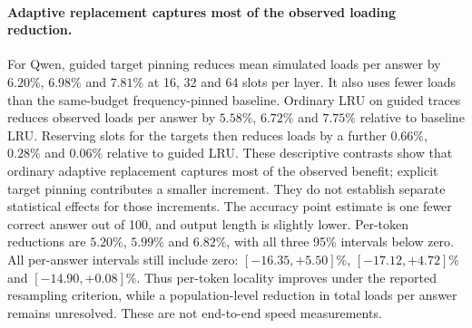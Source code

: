 \documentclass[12pt,a4paper,twoside,openright]{book}
\begin{document}
\begin{table}[ht]
\centering\small
\caption{Relative change (percent) for guided target pinning versus baseline LRU, with paired dataset-stratified problem-bootstrap 95\% intervals. Negative values mean fewer simulated loads. Intervals use 5,000 resamples, seed 42, and no multiplicity correction.}
\label{tab:cache-multimodel-effects}
\end{table}


\paragraph{Adaptive replacement captures most of the observed loading reduction.}
For Qwen, guided target pinning reduces mean simulated loads per answer by
$6.20\%$, $6.98\%$ and $7.81\%$ at 16, 32 and 64 slots per layer. It also uses
fewer loads than the same-budget frequency-pinned baseline. Ordinary LRU on
guided traces reduces observed loads per answer by $5.58\%$, $6.72\%$ and
$7.75\%$ relative to baseline LRU. Reserving slots for the targets then
reduces loads by a further $0.66\%$, $0.28\%$ and $0.06\%$ relative to guided
LRU. These descriptive contrasts show that ordinary adaptive replacement
captures most of the observed benefit; explicit target pinning contributes a
smaller increment. They do not establish separate statistical effects for
those increments. The accuracy point estimate is one fewer correct answer out
of 100, and output length is slightly lower. Per-token reductions are
$5.20\%$, $5.99\%$ and $6.82\%$, with all three 95\% intervals below zero. All
per-answer intervals still include zero: $[-16.35,+5.50]\%$,
$[-17.12,+4.72]\%$ and $[-14.90,+0.08]\%$. Thus per-token locality improves
under the reported resampling criterion, while a population-level reduction in
total loads per answer remains unresolved. These are not end-to-end speed
measurements.
\end{document}
